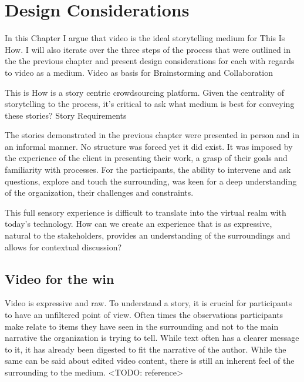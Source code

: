 \chapter{Design Considerations}
\label{chap_design_consider}

In this Chapter I argue that video is the ideal storytelling medium for This Is How. I will also iterate over the three steps of the process that were outlined in the the previous chapter and present design considerations for each with regards to video as a medium. 
Video as basis for Brainstorming and Collaboration

This is How is a story centric crowdsourcing platform. Given the centrality of storytelling to the process, it’s critical to ask what medium is best for conveying these stories?
Story Requirements

The stories demonstrated in the previous chapter were presented in person and in an informal manner. No structure was forced yet it did exist. It was imposed by the experience of the client in presenting their work,  a grasp of their goals and familiarity with processes. For the participants, the ability to intervene and ask questions, explore and touch the surrounding, was keen for a deep understanding of the organization, their challenges and constraints. 

This full sensory experience is difficult to translate into the virtual realm with today's technology. How can we create an experience that is as expressive, natural to the stakeholders, provides an understanding of the surroundings and allows for contextual discussion?

\section{Video for the win}

Video is expressive and raw. To understand a story, it is crucial for participants to have an unfiltered point of view. Often times the observations participants make relate to items they have seen in the surrounding and not to the main narrative the organization is trying to tell. While text often has a clearer message to it, it has already been digested to fit the narrative of the author. While the same can be said about edited video content, there is still an inherent feel of the surrounding to the medium. <TODO: reference>


